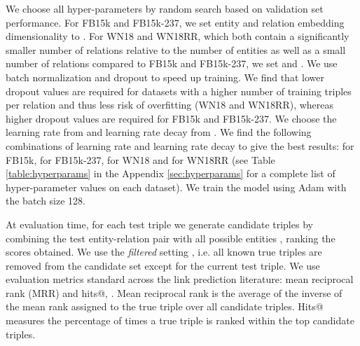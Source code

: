 \documentclass[11pt,a4paper]{article}
\begin{document}
We choose all hyper-parameters by random search based on validation set performance. For FB15k and FB15k-237, we set entity and relation embedding dimensionality to . For WN18 and WN18RR, which both contain a significantly smaller number of relations relative to the number of entities as well as a small number of relations compared to FB15k and FB15k-237, we set  and .  We use batch normalization \cite{ioffe2015batch} and dropout \cite{srivastava2014dropout} to speed up training. We find that lower dropout values  are required for datasets with a higher number of training triples per relation and thus less risk of overfitting (WN18 and WN18RR), whereas higher dropout values  are required for FB15k and FB15k-237. We choose the learning rate from  and learning rate decay from . We find the following combinations of learning rate and learning rate decay to give the best results:   for FB15k,  for FB15k-237,  for WN18 and  for WN18RR (see Table \ref{table:hyperparams} in the Appendix \ref{sec:hyperparams} for a complete list of hyper-parameter values on each dataset). We train the model using Adam \cite{kingma2014adam} with the batch size 128.

At evaluation time, for each test triple we generate  candidate triples by combining the test entity-relation pair with all possible entities , ranking the scores obtained. We use the \textit{filtered} setting \cite{bordes2013translating}, i.e. all known true triples are removed from the candidate set except for the current test triple. We use evaluation metrics standard across the link prediction literature: mean reciprocal rank (MRR) and hits@, . Mean reciprocal rank is the average of the inverse of the mean rank assigned to the true triple over all candidate triples. Hits@ measures the percentage of times a true triple is ranked within the top  candidate triples.

\begin{table}[!htp]
    \centering
    \caption{Dataset statistics.}
    \vspace{-0.2cm}
     \label{datasets}
 \end{table}
\end{document}

